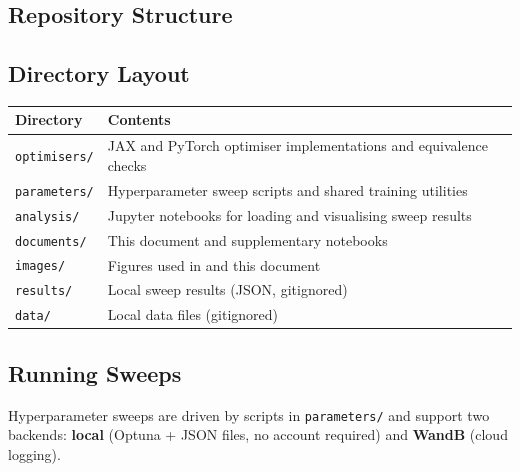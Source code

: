 \documentclass{article}
\begin{document}
\begin{appendices}
\section{Repository Structure}\label{app:repo}

\subsection{Directory Layout}
\begin{center}
\small
\begin{tabular}{@{}lp{8cm}@{}}
    \toprule
    \textbf{Directory} & \textbf{Contents} \\
    \midrule
    \texttt{optimisers/}  & JAX and PyTorch optimiser implementations and equivalence checks \\
    \texttt{parameters/}  & Hyperparameter sweep scripts and shared training utilities \\
    \texttt{analysis/}    & Jupyter notebooks for loading and visualising sweep results \\
    \texttt{documents/}   & This document and supplementary notebooks \\
    \texttt{images/}      & Figures used in \cite{harvey2025} and this document \\
    \texttt{results/}     & Local sweep results (JSON, gitignored) \\
    \texttt{data/}        & Local data files (gitignored) \\
    \bottomrule
\end{tabular}
\end{center}

\subsection{Running Sweeps}
Hyperparameter sweeps are driven by scripts in \texttt{parameters/} and support two backends:
\textbf{local} (Optuna + JSON files, no account required) and \textbf{WandB} (cloud logging).


\end{appendices}
\end{document}
